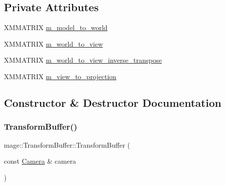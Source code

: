 \subsection*{Private Attributes}
\begin{DoxyCompactItemize}
\item 
X\+M\+M\+A\+T\+R\+IX \hyperlink{structmage_1_1_transform_buffer_ac5f95a7f0e9ac61140c3520675da8e52}{m\+\_\+model\+\_\+to\+\_\+world}
\item 
X\+M\+M\+A\+T\+R\+IX \hyperlink{structmage_1_1_transform_buffer_af014f4da6aa86484c99c6b429af7da75}{m\+\_\+world\+\_\+to\+\_\+view}
\item 
X\+M\+M\+A\+T\+R\+IX \hyperlink{structmage_1_1_transform_buffer_a334cb416c43803c805bc7b57fe3a908e}{m\+\_\+world\+\_\+to\+\_\+view\+\_\+inverse\+\_\+transpose}
\item 
X\+M\+M\+A\+T\+R\+IX \hyperlink{structmage_1_1_transform_buffer_a4f077fa865fe8edf41619f5941ee605c}{m\+\_\+view\+\_\+to\+\_\+projection}
\end{DoxyCompactItemize}


\subsection{Constructor \& Destructor Documentation}
\hypertarget{structmage_1_1_transform_buffer_a9a627fb63533073b2c699136e04dae14}{}\label{structmage_1_1_transform_buffer_a9a627fb63533073b2c699136e04dae14} 
\subsubsection{\texorpdfstring{Transform\+Buffer()}{TransformBuffer()}\hspace{0.1cm}{\footnotesize\ttfamily [1/3]}}
{\footnotesize\ttfamily mage\+::\+Transform\+Buffer\+::\+Transform\+Buffer (\begin{DoxyParamCaption}\item[{const \hyperlink{classmage_1_1_camera}{Camera} \&}]{camera }\end{DoxyParamCaption})\hspace{0.3cm}{\ttfamily [explicit]}}

\hypertarget{structmage_1_1_transform_buffer_a1ede694450450cc6b13a5caed373abad}{}\label{structmage_1_1_transform_buffer_a1ede694450450cc6b13a5caed373abad} 
